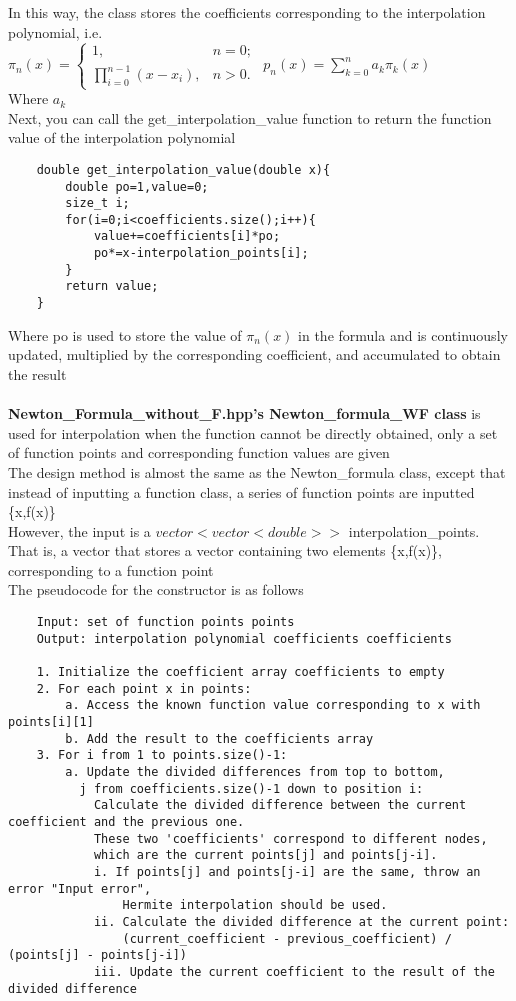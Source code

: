 \documentclass[a4paper]{article}
\begin{document}
In this way, the class stores the coefficients corresponding to the interpolation polynomial, i.e. \\
\(\pi_n(x) = \begin{cases}
    1, & n = 0; \\
    \prod_{i=0}^{n-1}(x - x_i), & n > 0.
\end{cases}\)
$p_n(x) = \sum_{k=0}^{n} a_k \pi_k(x)$ \\
Where $a_k$ \\
Next, you can call the get\_interpolation\_value function to return the function value of the interpolation polynomial \\
\begin{verbatim}
    double get_interpolation_value(double x){
        double po=1,value=0;
        size_t i;
        for(i=0;i<coefficients.size();i++){
            value+=coefficients[i]*po;
            po*=x-interpolation_points[i];
        }
        return value;
    }
\end{verbatim}
Where po is used to store the value of $\pi_n(x)$ in the formula and is continuously updated, multiplied by the corresponding coefficient, and accumulated to obtain the result \\
\\
\textbf{Newton\_Formula\_without\_F.hpp's Newton\_formula\_WF class} is used for interpolation when the function cannot be directly obtained, only a set of function points and corresponding function values are given \\
The design method is almost the same as the Newton\_formula class, except that instead of inputting a function class, a series of function points are inputted \{x,f(x)\} \\
However, the input is a $vector<vector<double>>$ interpolation\_points. That is, a vector that stores a vector containing two elements \{x,f(x)\}, corresponding to a function point \\
The pseudocode for the constructor is as follows
\begin{verbatim}
    Input: set of function points points
    Output: interpolation polynomial coefficients coefficients

    1. Initialize the coefficient array coefficients to empty
    2. For each point x in points:
        a. Access the known function value corresponding to x with points[i][1]
        b. Add the result to the coefficients array
    3. For i from 1 to points.size()-1:
        a. Update the divided differences from top to bottom, 
          j from coefficients.size()-1 down to position i:
            Calculate the divided difference between the current coefficient and the previous one.
            These two 'coefficients' correspond to different nodes, 
            which are the current points[j] and points[j-i].
            i. If points[j] and points[j-i] are the same, throw an error "Input error", 
                Hermite interpolation should be used.
            ii. Calculate the divided difference at the current point:
                (current_coefficient - previous_coefficient) / (points[j] - points[j-i])
            iii. Update the current coefficient to the result of the divided difference
\end{verbatim}
\end{document}
